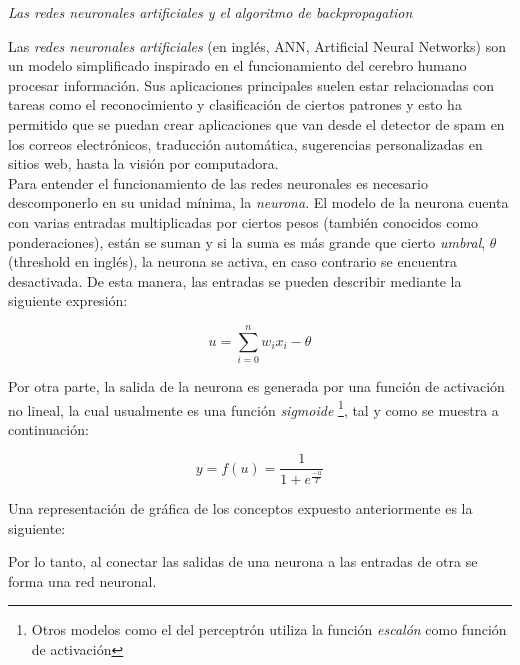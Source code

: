 \documentclass[12pt]{article}
\begin{document}
\textit{Las redes neuronales artificiales y el algoritmo de backpropagation}


  Las \textit{redes neuronales artificiales} (en inglés, ANN, Artificial Neural
  Networks) son un modelo simplificado inspirado en el funcionamiento del
  cerebro humano procesar información. Sus aplicaciones principales suelen estar
  relacionadas con tareas como el reconocimiento y clasificación de ciertos
  patrones y esto ha permitido que se puedan crear aplicaciones que van desde el
  detector de spam en los correos electrónicos, traducción automática,
  sugerencias personalizadas en sitios web, hasta la visión por
  computadora.\cite{savage}\\

  Para entender el funcionamiento de las redes neuronales es necesario
  descomponerlo en su unidad mínima, la \textit{neurona}.  El modelo
  de la neurona cuenta con varias entradas multiplicadas por ciertos pesos
  (también conocidos como ponderaciones), están se suman y si la suma es más
  grande que cierto \textit{umbral}, $\theta$ (threshold en inglés), la neurona
  se activa, en caso contrario se encuentra desactivada. De esta manera, las
  entradas se pueden describir mediante la siguiente expresión:

  \[
    u = \sum_{i = 0}^{n} w_ix_i - \theta
  \]

  Por otra parte, la salida de la neurona es generada por una función de
  activación no lineal, la cual usualmente es una función \textit{sigmoide}
  \footnote{Otros modelos como el del perceptrón utiliza la función
  \textit{escalón} como función de activación}, tal y como se muestra a
  continuación:

  \[
    y = f(u) = \dfrac{1}{1+e^{\frac{-u}{T}}}
  \]

  Una representación de gráfica de los conceptos expuesto anteriormente es la
  siguiente:

  \begin{center}
  \end{center}

  Por lo tanto, al conectar las salidas de una neurona a las entradas de otra se
  forma una red neuronal.
\end{document}
